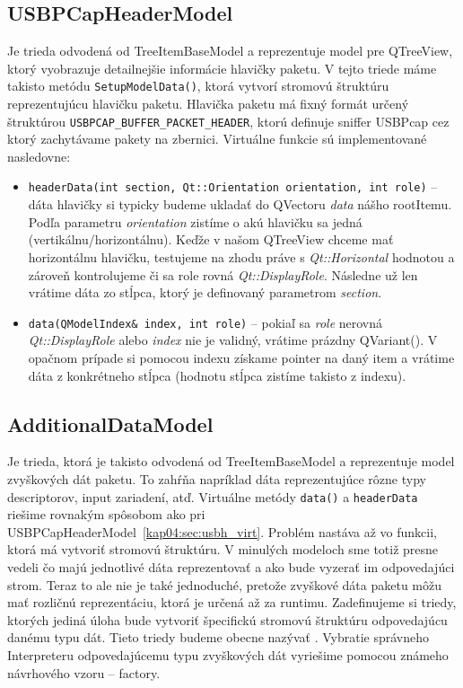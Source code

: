 \subsection{USBPCapHeaderModel}
Je trieda odvodená od TreeItemBaseModel a reprezentuje model pre QTreeView, ktorý vyobrazuje detailnejšie informácie hlavičky paketu. V tejto triede máme takisto metódu \texttt{SetupModelData()}, ktorá vytvorí stromovú štruktúru reprezentujúcu hlavičku paketu. Hlavička paketu má fixný formát určený štruktúrou \texttt{USBPCAP\_BUFFER\_PACKET\_HEADER}, ktorú definuje sniffer USBPcap cez ktorý zachytávame pakety na zbernici.
Virtuálne funkcie sú implementované nasledovne:
\begin{itemize}
\label{kap04:sec:usbh_virt}
\item \texttt{headerData(int section, Qt::Orientation orientation, int \newline role)} -- dáta hlavičky si typicky budeme ukladať do QVectoru \textit{data} nášho rootItemu. Podľa parametru \textit{orientation} zistíme o akú hlavičku sa jedná (vertikálnu/horizontálnu). Keďže v našom QTreeView chceme mať horizontálnu hlavičku, testujeme na zhodu práve s \textit{Qt::Horizontal} hodnotou a zároveň kontrolujeme či sa role rovná \textit{Qt::DisplayRole}. Následne už len vrátime dáta zo stĺpca, ktorý je definovaný parametrom \textit{section}.
\item \texttt{data(QModelIndex\& index, int role)} -- pokiaľ sa \textit{role} nerovná \newline \textit{Qt::DisplayRole} alebo \textit{index} nie je validný, vrátime prázdny QVariant(). V opačnom prípade si pomocou indexu získame pointer na daný item a vrátime dáta z konkrétneho stĺpca (hodnotu stĺpca zistíme takisto z indexu).
\end{itemize}

\subsection{AdditionalDataModel}
Je trieda, ktorá je takisto odvodená od TreeItemBaseModel a reprezentuje model zvyškových dát paketu. To zahŕňa napríklad dáta reprezentujúce rôzne typy descriptorov, input zariadení, atď. Virtuálne metódy \texttt{data()} a \texttt{headerData} riešime rovnakým spôsobom ako pri USBPCapHeaderModel~\ref{kap04:sec:usbh_virt}. Problém nastáva až vo funkcii, ktorá má vytvoriť stromovú štruktúru. V minulých modeloch sme totiž presne vedeli čo majú jednotlivé dáta reprezentovať a ako bude vyzerať im odpovedajúci strom. Teraz to ale nie je také jednoduché, pretože zvyškové dáta paketu môžu mať rozličnú reprezentáciu, ktorá je určená až za runtimu. Zadefinujeme si triedy, ktorých jediná úloha bude vytvoriť špecifickú stromovú štruktúru odpovedajúcu danému typu dát. Tieto triedy budeme obecne nazývať . Vybratie správneho Interpreteru odpovedajúcemu typu zvyškových dát vyriešime pomocou známeho návrhového vzoru -- factory.

